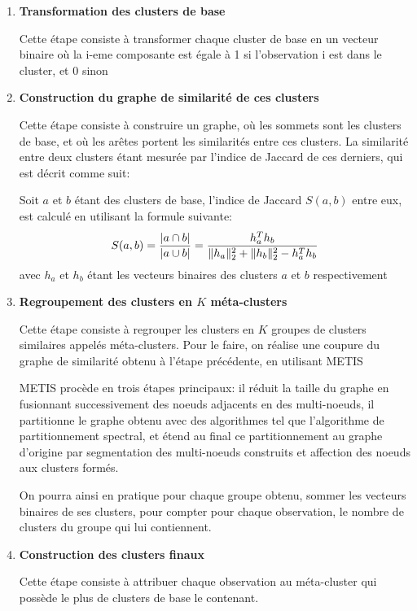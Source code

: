      	   \begin{enumerate}
     		   \item \textbf{Transformation des clusters de base}
  		 
     		   Cette étape consiste à transformer chaque cluster de base en un vecteur binaire où la i-eme composante est égale à 1 si l’observation i est dans le cluster, et 0 sinon
      
     		   \item \textbf{Construction du graphe de similarité de ces clusters}
     	 
     		   Cette étape consiste à construire un graphe, où les sommets sont les clusters de base, et où les arêtes portent les similarités entre ces clusters.
     		   La similarité entre deux clusters étant mesurée par l'indice de Jaccard de ces derniers, qui est décrit comme suit:
			 
     		   Soit $a$ et $b$ étant des clusters de base, l'indice de Jaccard $S(a, b)$ entre eux, est calculé en utilisant la formule suivante:
     		   \begin{equation}
					S(a, b) = \frac{|a \cap b|}{|a \cup b|} = \frac{h_a^{\small{T}} h_b}{\|h_a\|_2^2 + \|h_b\|_2^2 - h_a^{\small{T}} h_b}
				\end{equation}
     		   avec $h_a$ et $h_b$ étant les vecteurs binaires des clusters $a$ et $b$ respectivement
      
     		   \item \textbf{Regroupement des clusters en $K$ méta-clusters}
			 
     		   Cette étape consiste à regrouper les clusters en $K$ groupes de clusters similaires appelés méta-clusters.
     		   Pour le faire, on réalise une coupure du graphe de similarité obtenu à l'étape précédente, en utilisant METIS %
  	 
            	METIS procède en trois étapes principaux: il réduit la taille du graphe en fusionnant successivement des noeuds adjacents en des multi-noeuds, il partitionne le graphe obtenu avec des algorithmes tel que l'algorithme de partitionnement spectral, et étend au final ce partitionnement au graphe d'origine par segmentation des multi-noeuds construits et affection des noeuds aux clusters formés.
		 
     		   On pourra ainsi en pratique pour chaque groupe obtenu, sommer les vecteurs binaires de ses clusters, pour compter pour chaque observation, le nombre de clusters du groupe qui lui contiennent.
      
     		   \item \textbf{Construction des clusters finaux}
			 
     		   Cette étape consiste à attribuer chaque observation au méta-cluster qui possède le plus de clusters de base le contenant.
      
     	   \end{enumerate}

